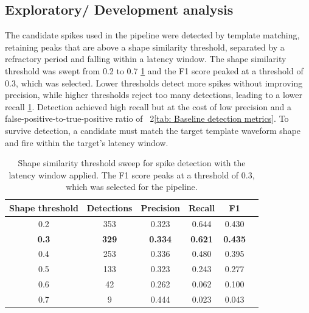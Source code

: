 \documentclass[ %
                    author={Daniel Page},
                supervisor={Dr. Andrew Calway},
                    degree={MSc},
                     title={Some Structural Guidelines for Data Science MSc Theses, Including Those With Long Titles that Run Across Multiple Lines on the Front Page},
                  subtitle={And those including an optional subtitle too, for good measure},
                      type={},
                      year={2021}]{dissertation}
\begin{document}
\subsection{Exploratory/ Development analysis}
The candidate spikes used in the pipeline were detected by template matching, retaining peaks that are above a shape similarity threshold, separated by a refractory period and falling within a latency window. 
The shape similarity threshold was swept from 0.2 to 0.7 \ref{tab: Shape sweep} and the F1 score peaked at a threshold of 0.3, which was selected. Lower thresholds detect more spikes without improving precision, while higher thresholds reject too many detections, leading to a lower recall \ref{tab: Shape sweep}. 
Detection achieved high recall but at the cost of low precision and a false-positive-to-true-positive ratio of ~2\ref{tab: Baseline detection metrics}. To survive detection, a candidate must match the target template waveform shape and fire within the target's latency window.
\begin{table}[htbp]
    \centering
    \begin{tabular}{cccccc}
    \toprule
     Shape threshold & Detections & Precision & Recall & F1 \\
     \midrule
      0.2 & 353 & 0.323 & 0.644 & 0.430 \\ 
      \textbf{0.3} & \textbf{329} & \textbf{0.334} & \textbf{0.621} & \textbf{0.435} \\
      0.4 & 253 & 0.336 & 0.480 & 0.395 \\
      0.5 & 133 & 0.323 & 0.243 & 0.277 \\
      0.6 & 42 & 0.262 & 0.062 & 0.100 \\
      0.7 & 9 & 0.444 & 0.023 & 0.043 \\
    \bottomrule
    \end{tabular}
    \caption{Shape similarity threshold sweep for spike detection with the latency window applied. The F1 score peaks at a threshold of 0.3, which was selected for the pipeline.}
    \label{tab: Shape sweep}
\end{table}
\end{document}
